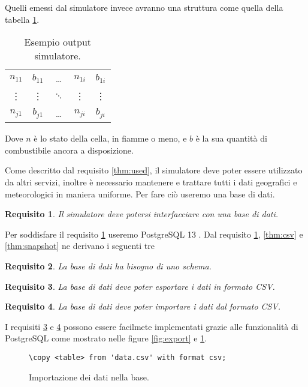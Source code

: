 \documentclass[draft]{article}
\newcommand{\eng}[1]{\foreignlanguage{english}{#1}} %
\newtheorem{requirement}{Requisito}
\begin{document}
Quelli emessi dal simulatore invece avranno una struttura come quella della
tabella \ref{tab:output}.

\begin{table}
\centering
\begin{tabular}{|c|c|c|c|c|}
	\hline
	$n_{11}$ & $b_{11}$ & \dots & $n_{1i}$ & $b_{1i}$\\
	\vdots & \vdots & $\ddots$ & \vdots & \vdots\\
	$n_{j1}$ & $b_{j1}$ & \dots & $n_{ji}$ & $b_{ji}$\\
	\hline
\end{tabular}
\caption{Esempio \eng{output} simulatore.}
\label{tab:output}
\end{table}

Dove $n$ è lo stato della cella, in fiamme o meno, e $b$ è la sua quantità di
combustibile ancora a disposizione.
\fi

Come descritto dal requisito \ref{thm:used}, il simulatore deve poter essere
utilizzato da altri servizi, inoltre è necessario mantenere e trattare tutti i
dati geografici e meteorologici in maniera uniforme. Per fare ciò useremo una
base di dati.

\begin{requirement}\label{thm:db}
Il simulatore deve potersi interfacciare con una base di dati.
\end{requirement}

Per soddisfare il requisito \ref{thm:db} useremo PostgreSQL 13 \cite{psql}. Dal
requisito \ref{thm:db}, \ref{thm:csv} e \ref{thm:snapshot} ne derivano i
seguenti tre

\begin{requirement}
La base di dati ha bisogno di uno schema.
\end{requirement}

\begin{requirement}\label{thm:export}
La base di dati deve poter esportare i dati in formato CSV.
\end{requirement}

\begin{requirement}\label{thm:import}
La base di dati deve poter importare i dati dal formato CSV.
\end{requirement}

I requisiti \ref{thm:export} e \ref{thm:import} possono essere facilmete
implementati grazie alle funzionalità di PostgreSQL come mostrato nelle figure
\ref{fig:export} e \ref{fig:import}.

\begin{figure}
\centering\verb+\copy <table> from 'data.csv' with format csv;+
\caption{Importazione dei dati nella base.}
\label{fig:import}
\end{figure}
\end{document}
